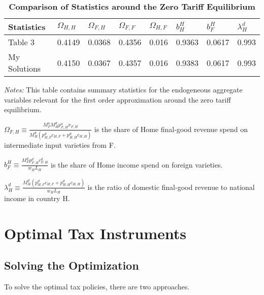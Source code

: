 \documentclass{homeworg}
\begin{document}
\begin{table}[H]
\centering
\caption{\textbf{Comparison of Statistics around the Zero Tariff Equilibrium}}
\label{tab:stats_compar}
\begin{tabular}{llllllll}
\hline\hline
Statistics   & $\Omega_{H, H}$ & $\Omega_{F, H}$ & $\Omega_{F, F}$ & $\Omega_{H, F}$ & $b^{H}_{H}$ & $b^{H}_{F}$ & $\lambda^{d}_{H}$ \\
\hline
Table 3 & 0.4149 & 0.0368 & 0.4356 & 0.016 & 0.9363 & 0.0617 & 0.993 \\
My Solutions & 0.4150 & 0.0367 & 0.4357 & 0.016 & 0.9383 & 0.0617 & 0.993 \\
\hline\hline
\end{tabular}
\begin{flushleft}
\scriptsize{\textit{Notes:} This table contains summary statistics for the endogeneous aggregate variables relevant for the first order approximation around the zero tariff equilibrium. 

$\Omega_{F, H}\equiv\frac{M^{u}_{F}M^{d}_{H}p^{u}_{F, H}x_{F, H}}{M^{d}_{H}(p^{d}_{H,F}c_{H,F}+p^{d}_{H,H}c_{H,H})}$ is the share of Home final-good revenue spend on intermediate input varieties from F. 

$b^{H}_{F}\equiv\frac{M^{d}_{F}p^{d}_{F,H}c^{d}_{F,H}}{w_{H}L_{H}}$ is the share of Home income spend on foreign varieties. 

$\lambda^{d}_{H}\equiv\frac{M^{d}_{H}(p^{d}_{H,F}c_{H,F}+p^{d}_{H,H}c_{H,H})}{w_{H}L_{H}}$ is the ratio of domestic final-good revenue to national income in country H.}
\end{flushleft}
\end{table}

\section{Optimal Tax Instruments}

\subsection{Solving the Optimization}

To solve the optimal tax policies, there are two approaches.
\end{document}
